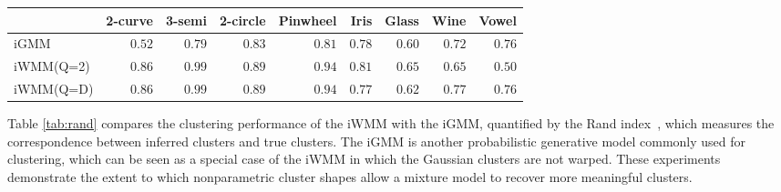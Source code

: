 \begin{table*}[ht!]
\centering
\caption{Average Rand index for evaluating clustering performance.}
\label{tab:rand}
\begin{tabular}{lrrrrrrrr}
\hline
 & 2-curve & 3-semi & 2-circle & Pinwheel & Iris  & Glass  & Wine  & Vowel  \\
\hline
iGMM & $0.52$ & $0.79$ & $0.83$ & $0.81$ & $0.78$ & $0.60$ & $0.72$ & $\mathbf{0.76}$ \\
iWMM(Q=2) & $\mathbf{0.86}$ & $\mathbf{0.99}$ & $\mathbf{0.89}$ & $\mathbf{0.94}$ & $\mathbf{0.81}$ & $\mathbf{0.65}$ & $0.65$ & $0.50$ \\
iWMM(Q=D) & $\mathbf{0.86}$ & $\mathbf{0.99}$ & $\mathbf{0.89}$ & $\mathbf{0.94}$ & $0.77$ & $0.62$ & $\mathbf{0.77}$ & $\mathbf{0.76}$ \\
\hline
\end{tabular}
\end{table*}
%
Table \ref{tab:rand} compares the clustering performance of the iWMM with the iGMM, quantified by the Rand index~\cite{rand1971objective}, which measures the correspondence between inferred clusters and true clusters.
The iGMM is another probabilistic generative model commonly used for clustering, which can be seen as a special case of the iWMM in which the Gaussian clusters are not warped.  
These experiments demonstrate the extent to which nonparametric cluster shapes allow a mixture model to recover more meaningful clusters.


